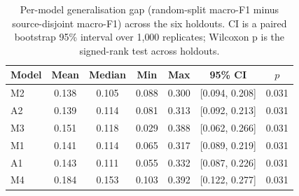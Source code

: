 
\begin{table}[!htbp]
\centering
\caption{Per-model generalisation gap (random-split macro-F1 minus source-disjoint macro-F1) across the six holdouts. CI is a paired bootstrap 95\% interval over 1{,}000 replicates; Wilcoxon p is the signed-rank test across holdouts.}
\label{tab:per_model_gap}
\begin{tabular}{lcccccc}
\hline\hline
Model & Mean & Median & Min & Max & 95\% CI & $p$ \\
\hline
M2 & 0.138 & 0.105 & 0.088 & 0.300 & [0.094, 0.208] & 0.031 \\
A2 & 0.139 & 0.114 & 0.081 & 0.313 & [0.092, 0.213] & 0.031 \\
M3 & 0.151 & 0.118 & 0.029 & 0.388 & [0.062, 0.266] & 0.031 \\
M1 & 0.141 & 0.114 & 0.065 & 0.317 & [0.089, 0.219] & 0.031 \\
A1 & 0.143 & 0.111 & 0.055 & 0.332 & [0.087, 0.226] & 0.031 \\
M4 & 0.184 & 0.153 & 0.103 & 0.392 & [0.122, 0.277] & 0.031 \\
\hline\hline
\end{tabular}
\end{table}

